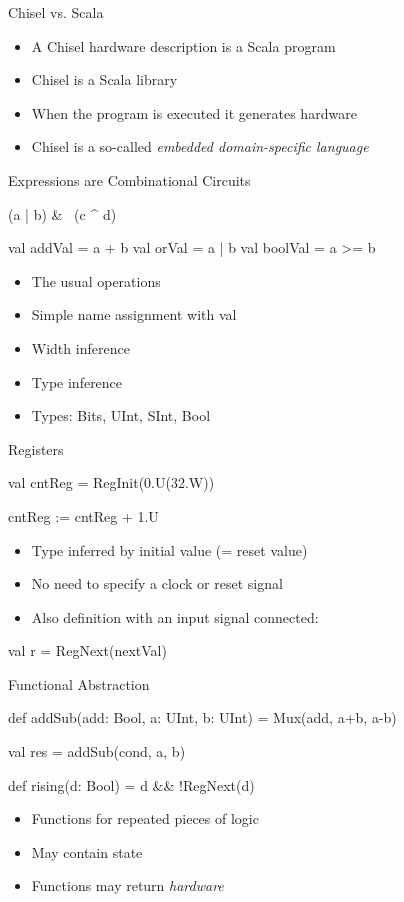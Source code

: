 \documentclass[xcolor=pdflatex,dvipsnames,table]{beamer}
\begin{document}
\begin{frame}[fragile]{Chisel vs. Scala}
\begin{itemize}
\item A Chisel hardware description is a Scala program
\item Chisel is a Scala library
\item When the program is executed it generates hardware
\item Chisel is a so-called \emph{embedded domain-specific language}
\end{itemize}
\end{frame}

\begin{frame}[fragile]{Expressions are Combinational Circuits}
\begin{chisel}
(a | b) & ~(c ^ d)

val addVal = a + b
val orVal = a | b
val boolVal = a >= b
\end{chisel}
\begin{itemize}
\item The usual operations 
\item Simple name assignment with val
\item Width inference
\item Type inference
\item Types: Bits, UInt, SInt, Bool
\end{itemize}
\end{frame}

\begin{frame}[fragile]{Registers}
\begin{chisel}
val cntReg = RegInit(0.U(32.W))

cntReg := cntReg + 1.U
\end{chisel}
\begin{itemize}
\item Type inferred by initial value (= reset value)
\item No need to specify a clock or reset signal
\end{itemize}
\begin{itemize}
\item Also definition with an input signal connected:
\end{itemize}
\begin{chisel}
val r = RegNext(nextVal) 
\end{chisel}
\end{frame}

\begin{frame}[fragile]{Functional Abstraction}
\begin{chisel}
  def addSub(add: Bool, a: UInt, b: UInt) =
    Mux(add, a+b, a-b)

  val res = addSub(cond, a, b)
  
  def rising(d: Bool) = d && !RegNext(d)
\end{chisel}
\begin{itemize}
\item Functions for repeated pieces of logic
\item May contain state
\item Functions may return \emph{hardware}
\end{itemize}
\end{frame}
\end{document}
